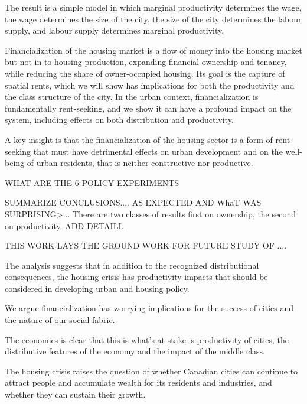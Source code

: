 The result is a simple model in which marginal productivity determines the wage, the wage determines the size of the city, the size of the city determines the labour supply, and labour supply determines marginal productivity. 

Financialization of the housing market is a flow of money into the housing market but not in to housing production, expanding financial ownership and tenancy, while reducing the share of owner-occupied housing. Its goal is the capture of spatial rents, which we will show has implications for both the productivity and the class structure of the city. 
In the urban context, financialization is fundamentally \gls{rent-seeking}, and we show it can have a profound impact on the system, including effects on both distribution and productivity. 

A key insight is that the financialization of the housing sector is a form of \gls{rent-seeking} that must have detrimental effects on urban development and on the well-being of urban residents, that is neither constructive nor productive.

WHAT ARE THE 6 POLICY EXPERIMENTS

SUMMARIZE CONCLUSIONS.... AS EXPECTED AND WhaT WAS SURPRISING>...
There are two classes of results first on ownership, the second on productivity. ADD DETAILL

THIS WORK LAYS THE GROUND WORK FOR FUTURE STUDY OF ....

The analysis suggests that in addition to the recognized distributional consequences, the housing crisis has productivity impacts that should be considered in developing urban and housing policy. 


We argue financialization %
has worrying implications for the success of cities and the nature of our social fabric. 

The economics is clear that this is what's at stake is productivity of cities, the distributive features of the economy and the impact of the middle class. 


The housing crisis raises the question of whether Canadian cities can continue to attract people and accumulate wealth for its residents and industries, and whether they can sustain their growth.



